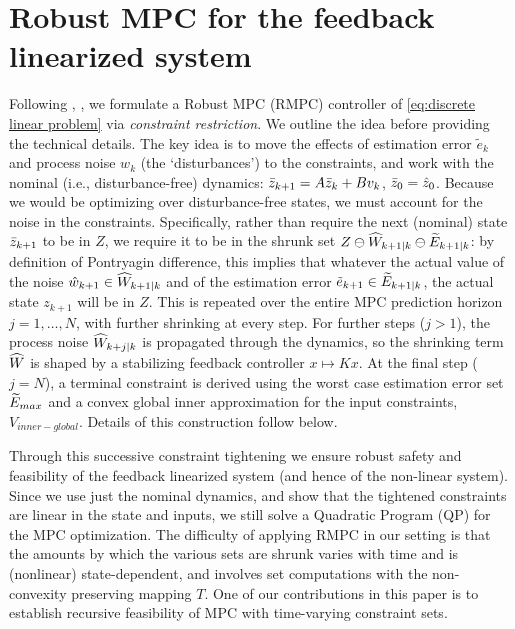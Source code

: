 \section{Robust MPC for the feedback linearized system}

Following \cite{RichardsH05_RMPC}, \cite{PantAMNDM15_Anytime}, we formulate a Robust MPC (RMPC) controller of \eqref{eq:discrete linear problem} via \emph{constraint restriction}.
We outline the idea before providing the technical details.
The key idea is to move the effects of estimation error $\tilde{e}_k$ and  process noise $w_k$ (the `disturbances') to the constraints, and work with the nominal  (i.e., disturbance-free) dynamics: $\bar{z}_{k+1} = A\bar{z}_{k}+Bv_k$, $\bar{z}_{0} = \hat{z}_0$.
Because we would be optimizing over disturbance-free states, we must account for the noise in the constraints. 
Specifically, rather than require the next (nominal) state $\bar{z}_{k+1}$ to be in $Z$, we require it to be in the shrunk set $Z \ominus \widehat{W}_{k+1|k} \ominus \widetilde{E}_{k+1|k}$: by definition of Pontryagin difference, this implies that whatever the actual value of the noise $\hat{w}_{k+1} \in \widehat{W}_{k+1|k}$ and of the estimation error $\tilde{e}_{k+1} \in \widetilde{E}_{k+1|k}$, the actual state $z_{k+1}$ will be in $Z$. 
This is repeated over the entire MPC prediction horizon $j=1,\ldots,N$, with further shrinking at every step.
For further steps ($j>1$), the process noise $\widehat{W}_{k+j|k}$ is propagated through the dynamics, so the shrinking term $\widehat{W}$ is shaped by a stabilizing feedback controller $x \mapsto Kx$.
At the final step ($j=N$), a terminal constraint is derived using the worst case estimation error set $\widetilde{E}_{max}$ and a convex global inner approximation for the input constraints, $V_{inner-global}$. 
Details of this construction follow below.

Through this successive constraint tightening we ensure robust safety and feasibility of the feedback linearized system (and hence of the non-linear system). 
Since we use just the nominal dynamics, and show that the tightened constraints are linear in the state and inputs, we still solve a Quadratic Program (QP) for the MPC optimization.
The difficulty of applying RMPC in our setting is that the amounts by which the various sets are shrunk varies with time and is (nonlinear) state-dependent, and involves set computations with the non-convexity preserving mapping $T$.
One of our contributions in this paper is to establish recursive feasibility of MPC with time-varying constraint sets.

